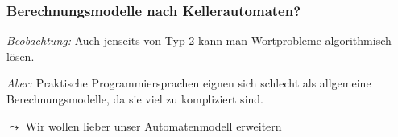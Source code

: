 \documentclass[onlymath]{beamer}
\begin{document}
\begin{frame}

\end{frame}

\begin{frame}\frametitle{Berechnungsmodelle nach Kellerautomaten?}

\emph{Beobachtung:} Auch jenseits von Typ 2 kann man Wortprobleme algorithmisch lösen.
\medskip

\pause

\emph{Aber:} Praktische Programmiersprachen eignen sich schlecht als allgemeine Berechnungsmodelle, da sie viel zu kompliziert sind.\bigskip

$\leadsto$ Wir wollen lieber unser Automatenmodell erweitern

\end{frame}
\end{document}
